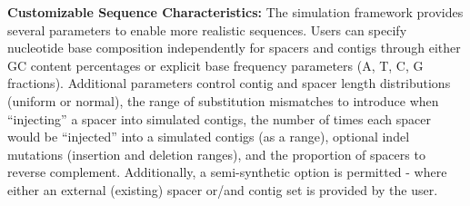 \documentclass[
]{article}
\begin{document}
\textbf{Customizable Sequence Characteristics:} The simulation framework
provides several parameters to enable more realistic sequences. Users
can specify nucleotide base composition independently for spacers and
contigs through either GC content percentages or explicit base frequency
parameters (A, T, C, G fractions). Additional parameters control contig
and spacer length distributions (uniform or normal), the range of
substitution mismatches to introduce when ``injecting'' a spacer into
simulated contigs, the number of times each spacer would be ``injected''
into a simulated contigs (as a range), optional indel mutations
(insertion and deletion ranges), and the proportion of spacers to
reverse complement. Additionally, a semi-synthetic option is permitted -
where either an external (existing) spacer or/and contig set is provided
by the user.
\end{document}
